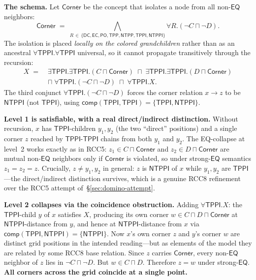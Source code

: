 \documentclass[
]{ceurart}
\theoremstyle{definition}
\newcommand{\PO}{\ensuremath{\mathsf{PO}}}
\newcommand{\EQ}{\ensuremath{\mathsf{EQ}}}
\newcommand{\TPP}{\ensuremath{\mathsf{TPP}}}
\newcommand{\NTPP}{\ensuremath{\mathsf{NTPP}}}
\newcommand{\TPPI}{\ensuremath{\mathsf{TPPI}}}
\newcommand{\NTPPI}{\ensuremath{\mathsf{NTPPI}}}
\newcommand{\DC}{\ensuremath{\mathsf{DC}}}
\newcommand{\EC}{\ensuremath{\mathsf{EC}}}
\newcommand{\comp}{\ensuremath{\mathsf{comp}}}
\begin{document}
\medskip\noindent\textbf{The schema.} Let $\textsf{Corner}$ be the
concept that isolates a node from all non-$\EQ$ neighbors:
\[
  \textsf{Corner} \;=\;
  \bigwedge_{R \,\in\, \{\DC,\EC,\PO,\TPP,\NTPP,\TPPI,\NTPPI\}}
    \forall R.(\neg C \sqcap \neg D).
\]
The isolation is placed \emph{locally on the colored grandchildren}
rather than as an ancestral $\forall\TPPI.\forall\TPPI$ universal,
so it cannot propagate transitively through the recursion:
\begin{align*}
  X \;=\; &\exists\TPPI.\exists\TPPI.(C \sqcap \textsf{Corner})
    \;\sqcap\; \exists\TPPI.\exists\TPPI.(D \sqcap \textsf{Corner}) \\
  &\sqcap\; \forall\TPPI.(\neg C \sqcap \neg D)
    \;\sqcap\; \forall\TPPI.X.
\end{align*}
The third conjunct $\forall\TPPI.(\neg C \sqcap \neg D)$ forces the
corner relation $x \to z$ to be $\NTPPI$ (not $\TPPI$), using
$\comp(\TPPI,\TPPI) = \{\TPPI, \NTPPI\}$.

\medskip\noindent\textbf{Level 1 is satisfiable, with a real
direct/indirect distinction.} Without recursion, $x$ has
$\TPPI$-children $y_1, y_2$ (the two ``direct'' positions) and a
single corner $z$ reached by $\TPPI$-$\TPPI$ chains from both
$y_1$ and $y_2$.  The EQ-collapse at level~2 works exactly as
in RCC5: $z_1 \in C \sqcap \textsf{Corner}$ and $z_2 \in D \sqcap
\textsf{Corner}$ are mutual non-$\EQ$ neighbors only if
$\textsf{Corner}$ is violated, so under strong-$\EQ$ semantics
$z_1 = z_2 = z$.  Crucially, $z \neq y_1, y_2$ in general: $z$ is
$\NTPPI$ of $x$ while $y_1, y_2$ are $\TPPI$---the direct/indirect
distinction survives, which is a genuine RCC8 refinement over the
RCC5 attempt of~\S\ref{sec:domino-attempt}.

\medskip\noindent\textbf{Level 2 collapses via the coincidence
obstruction.} Adding $\forall\TPPI.X$: the $\TPPI$-child $y$ of
$x$ satisfies $X$, producing its own corner $w \in C \sqcap D
\sqcap \textsf{Corner}$ at $\NTPPI$-distance from $y$, and hence
at $\NTPPI$-distance from $x$ via
$\comp(\TPPI, \NTPPI) = \{\NTPPI\}$.  Now $x$'s own corner $z$ and
$y$'s corner $w$ are distinct grid positions in the intended
reading---but as elements of the model they are related by some
RCC8 base relation.  Since $z$ carries $\textsf{Corner}$, every
non-$\EQ$ neighbor of $z$ lies in $\neg C \sqcap \neg D$.  But
$w \in C \sqcap D$.  Therefore $z = w$ under strong-$\EQ$.
\textbf{All corners across the grid coincide at a single point.}
\end{document}
